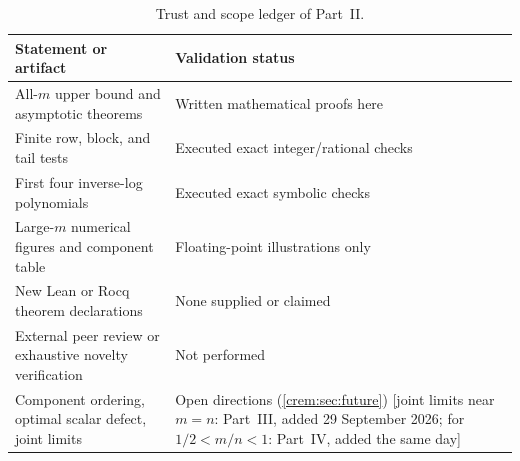 \documentclass[11pt,a4paper]{article}
\theoremstyle{definition}\newaliascnt{definition}{theorem}
\theoremstyle{remark}\newaliascnt{remark}{theorem}
\begin{document}
\begin{table}[htbp]
\centering\small
\caption{Trust and scope ledger of Part~II.}
\label{crem:tab:ledger}
\begin{tabular}{p{.47\linewidth}p{.43\linewidth}}
\toprule
Statement or artifact & Validation status\\
\midrule
All-$m$ upper bound and asymptotic theorems & Written mathematical proofs here\\
Finite row, block, and tail tests & Executed exact integer/rational checks\\
First four inverse-log polynomials & Executed exact symbolic checks\\
Large-$m$ numerical figures and component table & Floating-point illustrations only\\
New Lean or Rocq theorem declarations & None supplied or claimed\\
External peer review or exhaustive novelty verification & Not performed\\
Component ordering, optimal scalar defect, joint limits & Open directions (\cref{crem:sec:future}) [joint limits near $m=n$: Part~III, added 29 September 2026; for $1/2<m/n<1$: Part~IV, added the same day]\\
\bottomrule
\end{tabular}
\end{table}
\end{document}
